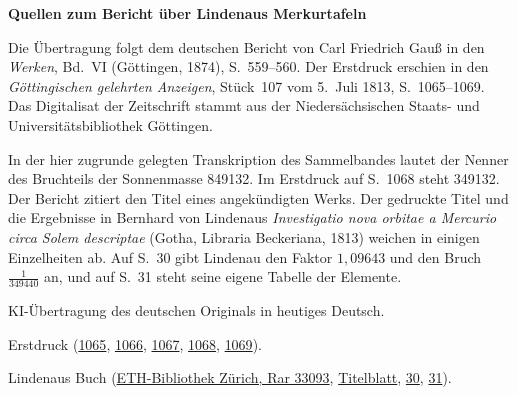 \clearpage\thispagestyle{empty}
\begin{center}\Large\bfseries Quellen zum Bericht über Lindenaus Merkurtafeln\end{center}

Die Übertragung folgt dem deutschen Bericht von Carl Friedrich Gauß in den \emph{Werken}, Bd.~VI (Göttingen, 1874), S.~559--560. Der Erstdruck erschien in den \emph{Göttingischen gelehrten Anzeigen}, Stück~107 vom 5.~Juli 1813, S.~1065--1069. Das Digitalisat der Zeitschrift stammt aus der Niedersächsischen Staats- und Universitätsbibliothek Göttingen.

In der hier zugrunde gelegten Transkription des Sammelbandes lautet der Nenner des Bruchteils der Sonnenmasse 849132. Im Erstdruck auf S.~1068 steht 349132. Der Bericht zitiert den Titel eines angekündigten Werks. Der gedruckte Titel und die Ergebnisse in Bernhard von Lindenaus \emph{Investigatio nova orbitae a Mercurio circa Solem descriptae} (Gotha, Libraria Beckeriana, 1813) weichen in einigen Einzelheiten ab. Auf S.~30 gibt Lindenau den Faktor $1{,}09643$ und den Bruch $\frac{1}{349440}$ an, und auf S.~31 steht seine eigene Tabelle der Elemente.

KI-Übertragung des deutschen Originals in heutiges Deutsch.

Erstdruck (\href{https://images.p.sub.uni-goettingen.de/iiif/image/gdz:PPN319721507_1813:00001069/full/1650,/0/default.jpg}{1065}, \href{https://images.p.sub.uni-goettingen.de/iiif/image/gdz:PPN319721507_1813:00001070/full/1650,/0/default.jpg}{1066}, \href{https://images.p.sub.uni-goettingen.de/iiif/image/gdz:PPN319721507_1813:00001071/full/1650,/0/default.jpg}{1067}, \href{https://images.p.sub.uni-goettingen.de/iiif/image/gdz:PPN319721507_1813:00001072/full/1650,/0/default.jpg}{1068}, \href{https://images.p.sub.uni-goettingen.de/iiif/image/gdz:PPN319721507_1813:00001073/full/1650,/0/default.jpg}{1069}).

Lindenaus Buch (\href{https://doi.org/10.3931/e-rara-72976}{ETH-Bibliothek Zürich, Rar 33093}, \href{https://www.e-rara.ch/i3f/v20/20184929/full/1650,/0/default.jpg}{Titelblatt}, \href{https://www.e-rara.ch/i3f/v20/20184958/full/1650,/0/default.jpg}{30}, \href{https://www.e-rara.ch/i3f/v20/20184959/full/1650,/0/default.jpg}{31}).

\clearpage
